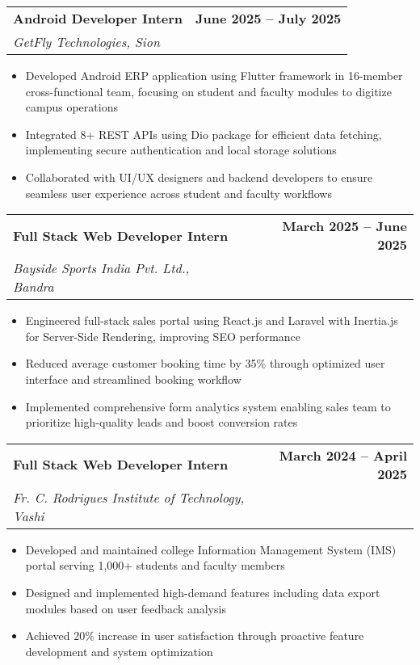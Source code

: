 \documentclass[10pt,a4paper]{article}
\makeatletter
\newcommand{\resumeItem}[1]{\item\small{#1}}
\newcommand{\resumeSubheading}[4]{
  \vspace{-1pt}
  \begin{tabular*}{\textwidth}[t]{l@{\extracolsep{\fill}}r}
    \textbf{#1} & \textcolor{light}{\small\textbf{#2}} \\
    \textit{\small#3} & \textcolor{light}{\small#4} \\
  \end{tabular*}\vspace{-5pt}
}
\makeatother
\begin{document}
\vspace{0.1em}

\resumeSubheading
{Android Developer Intern}{\textbf{June 2025 -- July 2025}}
{GetFly Technologies, Sion}{}
\begin{itemize}
    \resumeItem{Developed Android ERP application using Flutter framework in 16-member cross-functional team, focusing on student and faculty modules to digitize campus operations}
    \resumeItem{Integrated 8+ REST APIs using Dio package for efficient data fetching, implementing secure authentication and local storage solutions}
    \resumeItem{Collaborated with UI/UX designers and backend developers to ensure seamless user experience across student and faculty workflows}
\end{itemize}

\vspace{0.1em}

\resumeSubheading
{Full Stack Web Developer Intern}{\textbf{March 2025 -- June 2025}}
{Bayside Sports India Pvt. Ltd., Bandra}{}
\begin{itemize}
    \resumeItem{Engineered full-stack sales portal using React.js and Laravel with Inertia.js for Server-Side Rendering, improving SEO performance}
    \resumeItem{Reduced average customer booking time by 35\% through optimized user interface and streamlined booking workflow}
    \resumeItem{Implemented comprehensive form analytics system enabling sales team to prioritize high-quality leads and boost conversion rates}
\end{itemize}

\vspace{0.1em}

\resumeSubheading
{Full Stack Web Developer Intern}{\textbf{March 2024 -- April 2025}}
{Fr. C. Rodrigues Institute of Technology, Vashi}{}
\begin{itemize}
    \resumeItem{Developed and maintained college Information Management System (IMS) portal serving 1,000+ students and faculty members}
    \resumeItem{Designed and implemented high-demand features including data export modules based on user feedback analysis}
    \resumeItem{Achieved 20\% increase in user satisfaction through proactive feature development and system optimization}
\end{itemize}

\vspace{0.1em}

\end{document}
